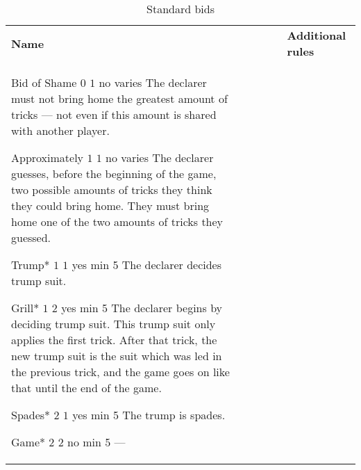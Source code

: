 %
%
%
%

\begin{table}
	\caption{Standard bids}\label{tab:standardBids}
	\begin{center}
		\begin{tabularx}{\textwidth}{lcccc|X}
				\textbf{Name} &
				\rotccw{\textbf{Worth}} &
				\rotccw{\textbf{Score}} &
				\rotccw{\textbf{Trump}} &
				\rotccw{\textbf{Tricks}} &
				\textbf{Additional rules}
				\\[-3ex]

				\standardBidItem%
				{Bid of Shame}
				{$0$}
				{$1$}
				{no}
				{varies}
				{%
					The declarer must not bring home the greatest amount of tricks --- not even if this amount is shared with another player.
				}

				\standardBidItem%
				{Approximately}
				{$1$}
				{$1$}
				{no}
				{varies}
				{%
					The declarer guesses, before the beginning of the game, two possible amounts of tricks they think they could bring home. They must bring home one of the two amounts of tricks they guessed.
				}

				\standardBidItem%
				{Trump*}
				{$1$}
				{$1$}
				{yes}
				{min 5}
				{%
					The declarer decides trump suit.
				}

				\standardBidItem%
				{Grill*}
				{$1$}
				{$2$}
				{yes}
				{min 5}
				{%
					The declarer begins by deciding trump suit. This trump suit only applies the first trick. After that trick, the new trump suit is the suit which was led in the previous trick, and the game goes on like that until the end of the game.
				}
				
				\standardBidItem%
				{Spades*}
				{$2$}
				{$1$}
				{yes}
				{min 5}
				{%
					The trump is spades.
				}

				\standardBidItem%
				{Game*}
				{$2$}
				{$2$}
				{no}
				{min 5}
				{%
					---
				}


\end{tabularx}
\end{center}
\end{table}
